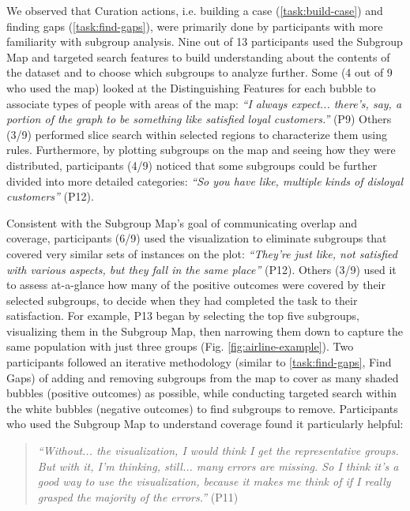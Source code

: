 We observed that Curation actions, i.e. building a case (\ref{task:build-case}) and finding gaps (\ref{task:find-gaps}), were primarily done by participants with more familiarity with subgroup analysis. 
Nine out of 13 participants used the Subgroup Map and targeted search features to build understanding about the contents of the dataset and to choose which subgroups to analyze further.
Some (4 out of 9 who used the map) looked at the Distinguishing Features for each bubble to associate types of people with areas of the map: \textit{``I always expect... there's, say, a portion of the graph to be something like satisfied loyal customers.''} (P9)
Others (3/9) performed slice search within selected regions to characterize them using rules.
Furthermore, by plotting subgroups on the map and seeing how they were distributed, participants (4/9) noticed that some subgroups could be further divided into more detailed categories: \textit{``So you have like, multiple kinds of disloyal customers''} (P12).

Consistent with the Subgroup Map's goal of communicating overlap and coverage, participants (6/9) used the visualization to eliminate subgroups that covered very similar sets of instances on the plot: \textit{``They're just like, not satisfied with various aspects, but they fall in the same place''} (P12).
Others (3/9) used it to assess at-a-glance how many of the positive outcomes were covered by their selected subgroups, to decide when they had completed the task to their satisfaction.
For example, P13 began by selecting the top five subgroups, visualizing them in the Subgroup Map, then narrowing them down to capture the same population with just three groups (Fig. \ref{fig:airline-example}).
Two participants followed an iterative methodology (similar to \ref{task:find-gaps}, Find Gaps) of adding and removing subgroups from the map to cover as many shaded bubbles (positive outcomes) as possible, while conducting targeted search within the white bubbles (negative outcomes) to find subgroups to remove.
Participants who used the Subgroup Map to understand coverage found it particularly helpful:
\begin{quote}
\textit{``Without... the visualization, I would think I get the representative groups. But with it, I'm thinking, still... many errors are missing. So I think it's a good way to use the visualization, because it makes me think of if I really grasped the majority of the errors.''} (P11)
\end{quote}


